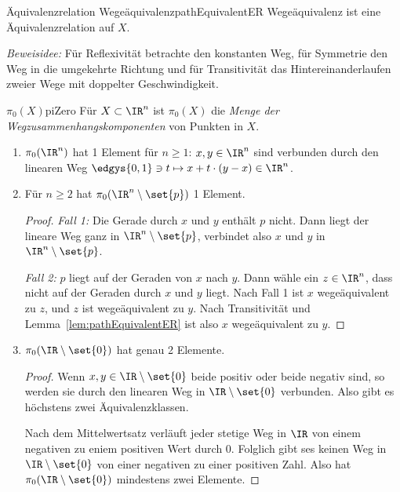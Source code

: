 \documentclass[language=ngerman]{TemplateLecture} %
\begin{document}
\begin{lem}{Äquivalenzrelation Wegeäquivalenz}{pathEquivalentER}
    Wegeäquivalenz ist eine Äquivalenzrelation auf $X$.
\end{lem}

\emph{Beweisidee:} Für Reflexivität betrachte den konstanten Weg, für Symmetrie den Weg in die umgekehrte Richtung und für Transitivität das Hintereinanderlaufen zweier Wege mit doppelter Geschwindigkeit.

\begin{defi}{$\pi_0(X)$}{piZero}
    Für $X \subset \IR^n$ ist $\pi_0(X)$ die \emph{Menge der Wegzusammenhangskomponenten} von Punkten in $X$.
\end{defi}

\begin{example}\leavevmode
    \begin{enumerate}[$(i)$]
        \item $\pi_0(\IR^n)$ hat 1 Element für $n \geq 1$: $x, y \in \IR^n$ sind verbunden durch den linearen Weg $\edgys{0,1} \ni t \mapsto x + t \cdot (y - x) \in \IR^n$.
        \item Für $n \geq 2$ hat $\pi_0(\IR^n \setminus \set{p})$ 1 Element.
        \begin{proof}
            \emph{Fall 1:} Die Gerade durch $x$ und $y$ enthält $p$ nicht. Dann liegt der lineare Weg ganz in $\IR^n \setminus \set{p}$, verbindet also $x$ und $y$ in $\IR^n \setminus \set{p}$.

            \emph{Fall 2:} $p$ liegt auf der Geraden von $x$ nach $y$. Dann wähle ein $z \in \IR^n$, dass nicht auf der Geraden durch $x$ und $y$ liegt. Nach Fall 1 ist $x$ wegeäquivalent zu $z$, und $z$ ist wegeäquivalent zu $y$. Nach Transitivität und Lemma~\ref{lem:pathEquivalentER} ist also $x$ wegeäquivalent zu $y$.
        \end{proof}
        \item $\pi_0(\IR \setminus \set{0})$ hat genau 2 Elemente.
        \begin{proof}
            Wenn $x, y \in \IR \setminus \set{0}$ beide positiv oder beide negativ sind, so werden sie durch den linearen Weg in $\IR \setminus \set{0}$ verbunden. Also gibt es höchstens zwei Äquivalenzklassen.

            Nach dem Mittelwertsatz verläuft jeder stetige Weg in $\IR$ von einem negativen zu eniem positiven Wert durch 0. Folglich gibt ses keinen Weg in $\IR \setminus \set{0}$ von einer negativen zu einer positiven Zahl. Also hat $\pi_0(\IR \setminus \set{0})$ mindestens zwei Elemente.
        \end{proof}
    \end{enumerate}
\end{example}
\end{document}
